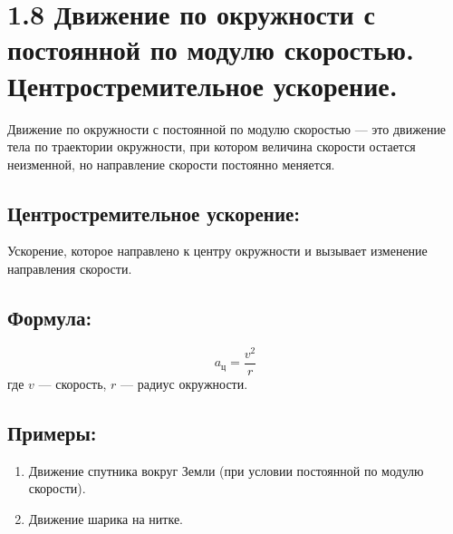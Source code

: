 \documentclass[a4paper,12pt]{article}
\begin{document}
\section*{1.8 Движение по окружности с постоянной по модулю скоростью. Центростремительное ускорение.}
\vspace{-9pt}
Движение по окружности с постоянной по модулю скоростью — это движение тела по траектории окружности, при котором величина скорости остается неизменной, но направление скорости постоянно меняется.
\vspace{-9pt}
\subsection*{Центростремительное ускорение:}
\vspace{-3pt}
Ускорение, которое направлено к центру окружности и вызывает изменение направления скорости.
\vspace{-9pt}
\subsection*{Формула:}
\vspace{-3pt}
$$a_ц = \frac{v^2}{r}$$ где $v$ — скорость, $r$ — радиус окружности.
\vspace{-9pt}
\subsection*{Примеры:}
\vspace{-3pt}
\begin{enumerate} [itemsep=0pt, topsep=0pt, parsep=3pt]
    \item Движение спутника вокруг Земли (при условии постоянной по модулю скорости).
    \item Движение шарика на нитке.
\end{enumerate}
\end{document}

